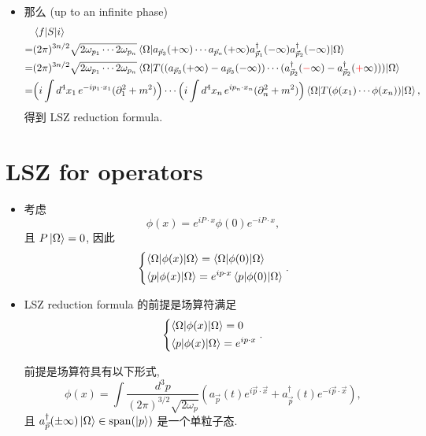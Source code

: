\begin{itemize}
	\item 那么 (up to an infinite phase)
	\begin{align}
		& \braket{f | S | i} \notag \\
		=& (2 \pi)^{3 n / 2} \sqrt{2 \omega_{p_1} \cdots 2 \omega_{p_n}} \braket{\Omega | a_{\vec{p}_3}(+ \infty) \cdots a_{\vec{p}_n}(+ \infty) a^\dag_{\vec{p}_1}(- \infty) a^\dag_{\vec{p}_2}(- \infty) | \Omega} \notag \\
		=& (2 \pi)^{3 n / 2} \sqrt{2 \omega_{p_1} \cdots 2 \omega_{p_n}} \braket{\Omega | T ((a_{\vec{p}_3}(+ \infty) - a_{\vec{p}_3}(- \infty)) \cdots (a^\dag_{\vec{p}_2}(\mathcolor{red}{-} \infty) - a^\dag_{\vec{p}_2}(\mathcolor{red}{+} \infty))) | \Omega} \notag \\
		=& \Big( i \int d^4 x_1 \, e^{- i p_1 \cdot x_1} (\partial_1^2 + m^2) \Big) \cdots \Big( i \int d^4 x_n \, e^{i p_n \cdot x_n} (\partial_n^2 + m^2) \Big) \braket{\Omega | T(\phi(x_1) \cdots \phi(x_n)) | \Omega},
	\end{align}
	得到 LSZ reduction formula.
\end{itemize}

\section{LSZ for operators}
\begin{itemize}
	\item 考虑
	\begin{equation}
		\phi(x) = e^{i P \cdot x} \phi(0) e^{- i P \cdot x},
	\end{equation}
	且 $P \ket{\Omega} = 0$, 因此
	\begin{equation}
		\begin{dcases}
			\braket{\Omega | \phi(x) | \Omega} = \braket{\Omega | \phi(0) | \Omega} \\
			\braket{p | \phi(x) | \Omega} = e^{i p \cdot x} \braket{p | \phi(0) | \Omega}
		\end{dcases}.
	\end{equation}
	
	\item LSZ reduction formula 的前提是场算符满足
	\begin{equation}
		\begin{dcases}
			\braket{\Omega | \phi(x) | \Omega} = 0 \\
			\braket{p | \phi(x) | \Omega} = e^{i p \cdot x}
		\end{dcases}.
	\end{equation}
	
	\begin{tcolorbox}[title=remark:]
		前提是场算符具有以下形式,
		\begin{equation}
			\phi(x) = \int \frac{d^3 p}{(2 \pi)^{3 / 2} \sqrt{2 \omega_p}} (a_{\vec{p}}(t) e^{i \vec{p} \cdot \vec{x}} + a^\dag_{\vec{p}}(t) e^{- i \vec{p} \cdot \vec{x}}),
		\end{equation}
		且 $a^\dag_{\vec{p}}(\pm \infty) \ket{\Omega} \in \mathrm{span}(\ket{p})$ 是一个单粒子态.
	\end{tcolorbox}
\end{itemize}
